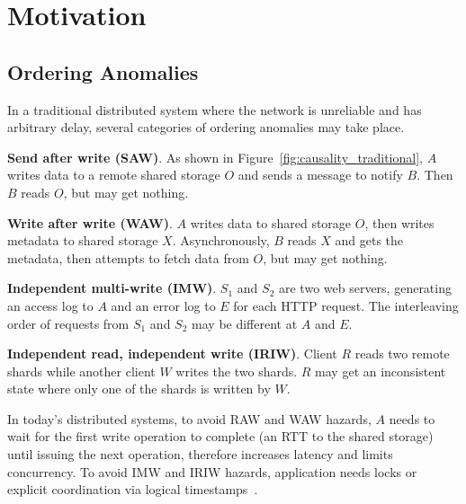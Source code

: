 \section{Motivation}
\label{sec:motivation}

\subsection{Ordering Anomalies}
\label{subsec:tso}

In a traditional distributed system where the network is unreliable and has arbitrary delay, several categories of ordering anomalies may take place.

\textbf{Send after write (SAW)}. As shown in Figure~\ref{fig:causality_traditional}, $A$ writes data to a remote shared storage $O$ and sends a message to notify $B$. Then $B$ reads $O$, but may get nothing.

\textbf{Write after write (WAW)}. $A$ writes data to shared storage $O$, then writes metadata to shared storage $X$. Asynchronously, $B$ reads $X$ and gets the metadata, then attempts to fetch data from $O$, but may get nothing.

\textbf{Independent multi-write (IMW)}. $S_1$ and $S_2$ are two web servers, generating an access log to $A$ and an error log to $E$ for each HTTP request. The interleaving order of requests from $S_1$ and $S_2$ may be different at $A$ and $E$.

\textbf{Independent read, independent write (IRIW)}. Client $R$ reads two remote shards while another client $W$ writes the two shards. $R$ may get an inconsistent state where only one of the shards is written by $W$.


In today's distributed systems, to avoid RAW and WAW hazards, $A$ needs to wait for the first write operation to complete (an RTT to the shared storage) until issuing the next operation, therefore increases latency and limits concurrency. To avoid IMW and IRIW hazards, application needs locks or explicit coordination via logical timestamps~\cite{lamport1978time}.


